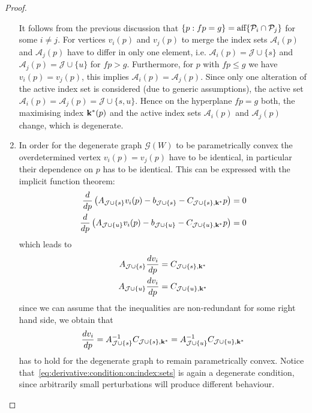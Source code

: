 \begin{proof}
\begin{enumerate}
%
It follows from the previous discussion that $\{p:fp=g\} = \textup{aff}\{\mathcal P_i\cap\mathcal P_j\}$ for some $i\neq j$.
%
For vertices $v_i(p)$ and $v_j(p)$ to merge the index sets $\mathcal A_i(p)$ and $\mathcal A_j(p)$ have to differ in only one 
element, i.e. $\mathcal A_i(p) = \mathcal J\cup \{s\}$ and $\mathcal A_j(p) = \mathcal J\cup\{u\}$ for $fp>g$.
%
Furthermore, for $p$ with $fp\leq g$ we have $v_i(p)=v_j(p)$, this implies $\mathcal A_i(p) = \mathcal A_j(p)$.
%
Since only one alteration of the active index set is considered (due to generic assumptions), the active set $\mathcal A_i(p) = \mathcal A_j(p)
= \mathcal J \cup \{s,u\}$.
%
Hence on the hyperplane $fp=g$ both, the maximising index ${\bf{k}}^\ast(p)$ and the active index sets $\mathcal A_i(p)$ 
and $\mathcal A_j(p)$ change, which is degenerate.
%
\item In order for the degenerate graph $\mathscr G(W)$ to be parametrically convex the overdetermined vertex $v_i(p)=v_j(p)$
have to be identical, in particular their dependence on $p$ has to be identical.
%
This can be expressed with the implicit function theorem:
%
\begin{equation*}\begin{split}
	\frac{d}{dp}\left(	A_{\mathcal J\cup \{s\}} v_i(p) - b_{\mathcal J\cup \{s\}} - C_{\mathcal J\cup \{s\},{\bf{k}}^\ast} p\right) &= 0\\
	\frac{d}{dp}\left(	A_{\mathcal J\cup \{u\}} v_i(p) - b_{\mathcal J\cup \{u\}} - C_{\mathcal J\cup \{u\},{\bf{k}}^\ast} p\right) &= 0
\end{split}\end{equation*}
%
which leads to 
%
\begin{equation*}\begin{split}
	A_{\mathcal J\cup \{s\}} \frac{dv_i}{dp} &= C_{\mathcal J\cup \{s\},{\bf{k}}^\ast}\\
	A_{\mathcal J\cup \{u\}} \frac{dv_i}{dp} &= C_{\mathcal J\cup \{u\},{\bf{k}}^\ast}
\end{split}\end{equation*}
%
since we can assume that the inequalities are non-redundant for some right hand side, we obtain that 
%
\begin{equation}\label{eq:derivative:condition:on:index:sets}
	\frac{dv_i}{dp} = A_{\mathcal J\cup \{s\}}^{-1}C_{\mathcal J\cup \{s\},{\bf{k}}^\ast} = 
	A_{\mathcal J\cup \{u\}}^{-1}C_{\mathcal J\cup \{u\},{\bf{k}}^\ast}
\end{equation}
%
has to hold for the degenerate graph to remain parametrically convex.
%
Notice that~\eqref{eq:derivative:condition:on:index:sets} is again a degenerate condition, since arbitrarily small perturbations
will produce different behaviour.
\end{enumerate}
\end{proof}
